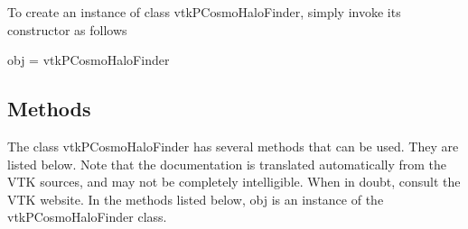 To create an instance of class vtk\-P\-Cosmo\-Halo\-Finder, simply invoke its constructor as follows \begin{DoxyVerb}  obj = vtkPCosmoHaloFinder
\end{DoxyVerb}
 \hypertarget{vtkwidgets_vtkxyplotwidget_Methods}{}\subsection{Methods}\label{vtkwidgets_vtkxyplotwidget_Methods}
The class vtk\-P\-Cosmo\-Halo\-Finder has several methods that can be used. They are listed below. Note that the documentation is translated automatically from the V\-T\-K sources, and may not be completely intelligible. When in doubt, consult the V\-T\-K website. In the methods listed below, {\ttfamily obj} is an instance of the vtk\-P\-Cosmo\-Halo\-Finder class. 

